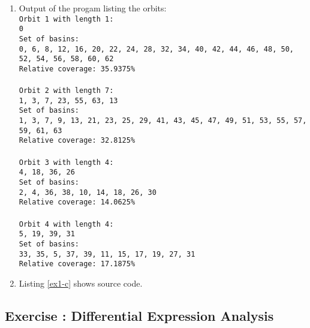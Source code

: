 \documentclass[10pt,a4paper]{article}
\newcommand{\exercise}[1]
{
  \stepcounter{subsection}
  \subsection*{Exercise \thesubsection: #1}

}
\begin{document}
\begin{enumerate}
\item Output of the progam listing the orbits:\\
\texttt{Orbit 1 with length 1:\\
0\\
Set of basins:\\
0, 6, 8, 12, 16, 20, 22, 24, 28, 32, 34, 40, 42, 44, 46, 48, 50, 52, 54, 56, 58, 60, 62\\
Relative coverage: 35.9375\%\\
\\
Orbit 2 with length 7:\\
1, 3, 7, 23, 55, 63, 13\\
Set of basins:\\
1, 3, 7, 9, 13, 21, 23, 25, 29, 41, 43, 45, 47, 49, 51, 53, 55, 57, 59, 61, 63\\
Relative coverage: 32.8125\%\\
\\
Orbit 3 with length 4:\\
4, 18, 36, 26\\
Set of basins:\\
2, 4, 36, 38, 10, 14, 18, 26, 30\\
Relative coverage: 14.0625\%\\
\\
Orbit 4 with length 4:\\
5, 19, 39, 31\\
Set of basins:\\
33, 35, 5, 37, 39, 11, 15, 17, 19, 27, 31\\
Relative coverage: 17.1875\%}




\item Listing \ref{ex1-c} shows source code.

\end{enumerate}
\exercise{Differential Expression Analysis}
\end{document}
